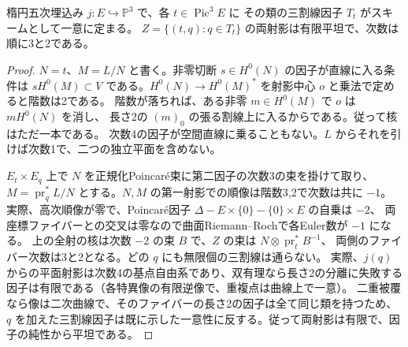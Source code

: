 \begin{lemma}\label{lem:elliptic-quintic-trisecants}
楕円五次埋込み $j:E\hookrightarrow\mathbb P^3$ で、各 $t\in\operatorname{Pic}^3 E$ に
その類の三割線因子 $T_t$ がスキームとして一意に定まる。
$Z=\{(t,q):q\in T_t\}$ の両射影は有限平坦で、次数は順に3と2である。
\end{lemma}
\begin{proof}
$N=t$、$M=L/N$ と書く。非零切断 $s\in H^0(N)$ の因子が直線に入る条件は
$sH^0(M)\subset V$ である。$H^0(N)\to H^0(M)^*$ を射影中心 $o$ と乗法で定めると階数は2である。
階数が落ちれば、ある非零 $m\in H^0(M)$ で $o$ は $mH^0(N)$ を消し、
長さ2の $(m)_0$ の張る割線上に入るからである。従って核はただ一本である。
次数4の因子が空間直線に乗ることもない。$L$ からそれを引けば次数1で、二つの独立平面を含めない。

$E_t\times E_q$ 上で $N$ を正規化Poincaré束に第二因子の次数3の束を掛けて取り、
$M=\operatorname{pr}_q^*L/N$ とする。$N,M$ の第一射影での順像は階数3,2で次数は共に $-1$。
実際、高次順像が零で、Poincaré因子 $\Delta-E\times\{0\}-\{0\}\times E$ の自乗は $-2$、
両座標ファイバーとの交叉は零なので曲面Riemann--Rochで各Euler数が $-1$ になる。
上の全射の核は次数 $-2$ の束 $B$ で、$Z$ の束は $N\otimes\operatorname{pr}_t^* B^{-1}$、
両側のファイバー次数は3と2となる。どの $q$ にも無限個の三割線は通らない。
実際、$j(q)$ からの平面射影は次数4の基点自由系であり、双有理なら長さ2の分離に失敗する
因子は有限である（各特異像の有限逆像で、重複点は曲線上で一意）。
二重被覆なら像は二次曲線で、そのファイバーの長さ2の因子は全て同じ類を持つため、
$q$ を加えた三割線因子は既に示した一意性に反する。従って両射影は有限で、因子の純性から平坦である。
\end{proof}

